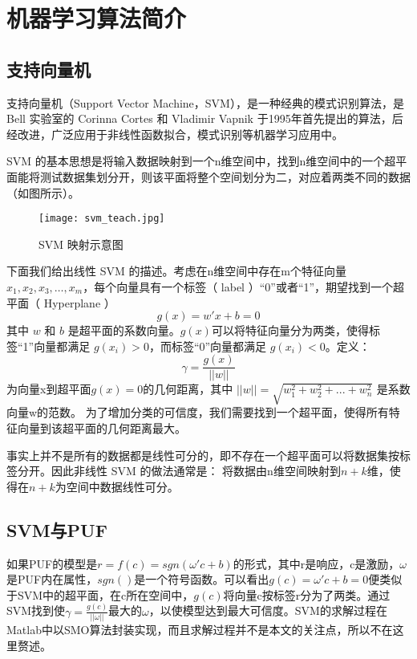 \section{机器学习算法简介}

\subsection{支持向量机}
支持向量机（Support Vector Machine，SVM），是一种经典的模式识别算法，是 Bell 实验室的 Corinna Cortes 和 Vladimir Vapnik 于1995年首先提出的算法，后经改进，广泛应用于非线性函数拟合，模式识别等机器学习应用中\supercite{cortes1995support}。

SVM 的基本思想是将输入数据映射到一个n维空间中，找到n维空间中的一个超平面能将测试数据集划分开，则该平面将整个空间划分为二，对应着两类不同的数据（如图所示）。

\begin{figure}[h]
\centering
\texttt{[image: svm\_teach.jpg]}
\caption{ SVM 映射示意图}
\label{fig:svm_proj}
\end{figure}

下面我们给出线性 SVM 的描述。考虑在n维空间中存在m个特征向量 $ x_1,x_2,x_3,…,x_m $，每个向量具有一个标签（ label ）``0''或者``1''，期望找到一个超平面（ Hyperplane ）
\begin{equation}
g(x)=w'x+b=0
\end{equation}
其中 $ w $ 和 $ b $ 是超平面的系数向量。$ g(x) $可以将特征向量分为两类，使得标签``1''向量都满足 $ g(x_i )>0 $，而标签``0''向量都满足 $ g(x_i )<0 $。定义：
\begin{equation}
\gamma=\frac{g(x)}{||w||}
\end{equation}
为向量x到超平面$ g(x)=0 $的几何距离，其中
$ ||w||=\sqrt{w_1^2+w_2^2+...+w_n^2} $
是系数向量w的范数。
为了增加分类的可信度，我们需要找到一个超平面，使得所有特征向量到该超平面的几何距离最大。

事实上并不是所有的数据都是线性可分的，即不存在一个超平面可以将数据集按标签分开。因此非线性 SVM 的做法通常是：
将数据由n维空间映射到$ n+k $维，使得在$ n+k $为空间中数据线性可分。

\subsection{SVM与PUF}
如果PUF的模型是$ r=f(c)=sgn(\omega'c+b) $的形式，其中r是响应，c是激励，$ \omega $是PUF内在属性，$ sgn() $是一个符号函数。可以看出$ g(c)=\omega'c+b=0 $便类似于SVM中的超平面，在c所在空间中，$ g(c) $将向量c按标签r分为了两类。通过SVM找到使$ \gamma=\frac{g(c)}{||\omega||} $最大的$ \omega $，以使模型达到最大可信度。SVM的求解过程在Matlab中以SMO算法封装实现，而且求解过程并不是本文的关注点，所以不在这里赘述。



